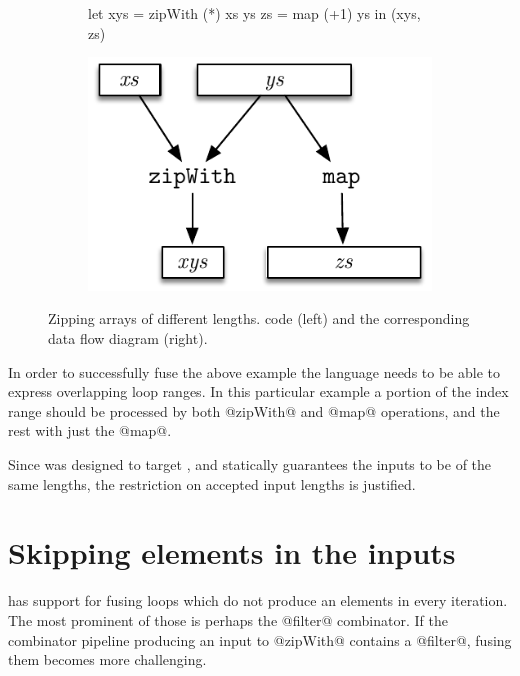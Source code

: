 \documentclass[preamble.tex]{subfiles}
\begin{document}
\begin{figure}

\begin{subfigure}{.6\textwidth}
\begin{hscode}
let xys = zipWith (*) xs ys
    zs  = map (+1) ys
in  (xys, zs)
\end{hscode}
\end{subfigure}%
%
\begin{subfigure}[right]{.4\textwidth}
\includegraphics[center,scale=\omniscale]{img/DFD-zipWithMap}
\end{subfigure}

\caption{Zipping arrays of different lengths. \Haskell code (left) and the corresponding data flow diagram (right).}
\label{fig:zipProblem1}
\end{figure}

In order to successfully fuse the above example the \Loop language needs to be able to express overlapping loop ranges. In this particular example a portion of the index range should be processed by both @zipWith@ and @map@ operations, and the rest with just the @map@.

Since \LiveFusion was designed to target \DPH\idph, and \DPH statically guarantees the inputs to be of the same lengths, the restriction on accepted input lengths is justified.



\clearpage
\section{Skipping elements in the inputs}

\LiveFusion has support for fusing loops which do not produce an elements in every iteration. The most prominent of those is perhaps the @filter@ combinator. If the combinator pipeline producing an input to @zipWith@ contains a @filter@, fusing them becomes more challenging.
\end{document}
